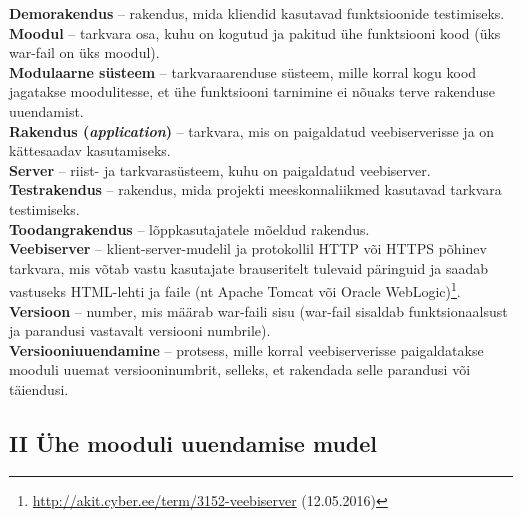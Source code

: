 \documentclass[12pt]{article}
\begin{document}
  \textbf{Demorakendus} \--- rakendus, mida kliendid kasutavad funktsioonide testimiseks.\\
  
  \textbf{Moodul} \--- tarkvara osa, kuhu on kogutud ja pakitud ühe funktsiooni kood (üks war\--fail on üks moodul).\\
  
  \textbf{Modulaarne süsteem} \--- tarkvaraarenduse süsteem, mille korral kogu kood jagatakse moodulitesse, et ühe funktsiooni tarnimine ei nõuaks terve rakenduse uuendamist.\\
  
  \textbf{Rakendus (\textit{application})} \--- tarkvara, mis on paigaldatud veebiserverisse ja on kättesaadav kasutamiseks.\\
  
  \textbf{Server} \--- riist- ja tarkvarasüsteem, kuhu on paigaldatud veebiserver.\\
  
  \textbf{Testrakendus} \--- rakendus, mida projekti meeskonnaliikmed kasutavad tarkvara testimiseks.\\
   
  \textbf{Toodangrakendus} \--- lõppkasutajatele mõeldud rakendus.\\
  
  \textbf{Veebiserver} \--- klient-server-mudelil ja protokollil HTTP või HTTPS põhinev tarkvara, mis võtab vastu kasutajate brauseritelt tulevaid päringuid ja saadab vastuseks HTML-lehti ja faile (nt Apache Tomcat või Oracle WebLogic)\footnote{\url{http://akit.cyber.ee/term/3152-veebiserver} (12.05.2016)}.\\
  
  \textbf{Versioon} \--- number, mis määrab war\--faili sisu (war\--fail sisaldab funktsionaalsust ja parandusi vastavalt versiooni numbrile).\\
  
  \textbf{Versiooniuuendamine} \--- protsess, mille korral veebiserverisse paigaldatakse mooduli uuemat versiooninumbrit, selleks, et rakendada selle parandusi või täiendusi.\\
  
  \newpage
  
  \subsection*{II Ühe mooduli uuendamise mudel}
  \label{bpmn-one}
  
\end{document}
